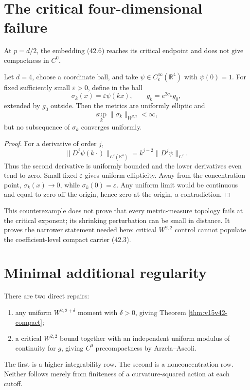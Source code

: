 \documentclass[11pt]{article}
\theoremstyle{remark}
\begin{document}
\section{The critical four-dimensional failure}

At \(p=d/2\), the embedding (42.6) reaches its critical endpoint and
does not give compactness in \(C^0\).

\begin{countertheorem}
\label{cth:v15v42-critical}
Let \(d=4\), choose a coordinate ball, and take
\(\psi\in C_c^\infty(\mathbb R^4)\) with \(\psi(0)=1\).
For fixed sufficiently small \(\varepsilon>0\), define in the ball
\[
 \sigma_k(x)=\varepsilon\psi(kx),\qquad
 g_k=e^{2\sigma_k}g_0,                                  \tag{42.16}
\]
extended by \(g_0\) outside.  Then the metrics are uniformly
elliptic and
\[
 \sup_k\|\sigma_k\|_{W^{2,2}}<\infty,                   \tag{42.17}
\]
but no subsequence of \(\sigma_k\) converges uniformly.
\end{countertheorem}

\begin{proof}
For a derivative of order \(j\),
\[
 \|D^j\psi(k\cdot)\|_{L^2(\mathbb R^4)}
 =k^{j-2}\|D^j\psi\|_{L^2}.                             \tag{42.18}
\]
Thus the second derivative is uniformly bounded and the lower
derivatives even tend to zero.  Small fixed \(\varepsilon\) gives
uniform ellipticity.  Away from the concentration point,
\(\sigma_k(x)\to0\), while \(\sigma_k(0)=\varepsilon\).
Any uniform limit would be continuous and equal to zero off the
origin, hence zero at the origin, a contradiction.
\end{proof}

This counterexample does not prove that every metric-measure
topology fails at the critical exponent; its shrinking perturbation
can be small in distance.  It proves the narrower statement needed
here: critical \(W^{2,2}\) control cannot populate the
coefficient-level compact carrier (42.3).

\section{Minimal additional regularity}

There are two direct repairs:
\begin{enumerate}
\item any uniform \(W^{2,2+\delta}\) moment with \(\delta>0\),
      giving Theorem \ref{thm:v15v42-compact};
\item a critical \(W^{2,2}\) bound together with an independent
      uniform modulus of continuity for \(g\), giving \(C^0\)
      precompactness by Arzela--Ascoli.
\end{enumerate}
The first is a higher integrability row.  The second is a
nonconcentration row.  Neither follows merely from finiteness of a
curvature-squared action at each cutoff.
\end{document}
